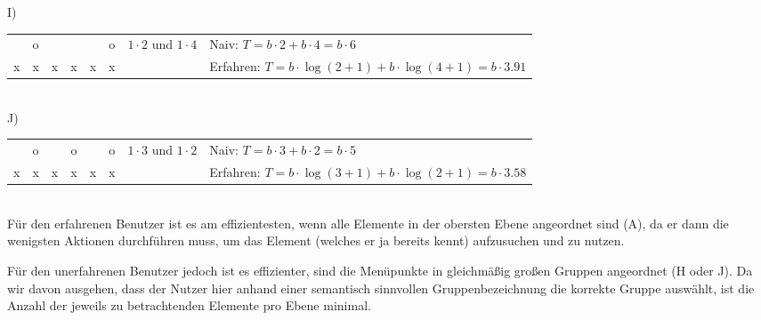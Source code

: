 \documentclass[a4paper,10pt]{article}
\begin{document}
I)\\
\begin{tabular}{|c|c|c|c|c|c|l|l}
\cline{1-6}   & o &   &   &   & o & $1\cdot 2$ und $1\cdot 4$ & Naiv: $T = b\cdot 2+b\cdot 4 = b\cdot 6$ \\
\cline{1-6} x & x & x & x & x & x &   & Erfahren: $T = b\cdot \log(2+1)+b\cdot \log(4+1) = b\cdot 3.91$ \\
\cline{1-6}
\end{tabular} \\

J)\\
\begin{tabular}{|c|c|c|c|c|c|l|l}
\cline{1-6}   & o &   & o &   & o & $1\cdot 3$ und $1\cdot 2$ & Naiv: $T = b\cdot 3+b\cdot 2 = b\cdot 5$ \\
\cline{1-6} x & x & x & x & x & x &   & Erfahren: $T = b\cdot \log(3+1)+b\cdot \log(2+1) = b\cdot 3.58$ \\
\cline{1-6}
\end{tabular} \\

Für den erfahrenen Benutzer ist es am effizientesten, wenn alle Elemente in der obersten Ebene angeordnet sind (A), da er dann die wenigsten Aktionen durchführen muss, um das Element (welches er ja bereits kennt) aufzusuchen und zu nutzen.

Für den unerfahrenen Benutzer jedoch ist es effizienter, sind die Menüpunkte in gleichmäßig großen Gruppen angeordnet (H oder J). Da wir davon ausgehen, dass der Nutzer hier anhand einer semantisch sinnvollen Gruppenbezeichnung die korrekte Gruppe auswählt, ist die Anzahl der jeweils zu betrachtenden Elemente pro Ebene minimal.
\end{document}
